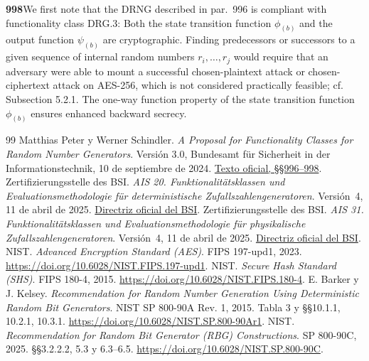 \documentclass[11pt,a4paper]{article}
\begin{document}
\textbf{998} We first note that the DRNG described in par.~996 is compliant with functionality class DRG.3: Both the state transition function \(\phi_{(b)}\) and the output function \(\psi_{(b)}\) are cryptographic. Finding predecessors or successors to a given sequence of internal random numbers \(r_i,\ldots,r_j\) would require that an adversary were able to mount a successful chosen-plaintext attack or chosen-ciphertext attack on AES-256, which is not considered practically feasible; cf. Subsection 5.2.1. The one-way function property of the state transition function \(\phi_{(b)}\) ensures enhanced backward secrecy.
\endgroup
\small
\begin{thebibliography}{99}
\setlength{\itemsep}{2pt}
 Matthias Peter y Werner Schindler. \emph{A Proposal for Functionality Classes for Random Number Generators}. Versión 3.0, Bundesamt für Sicherheit in der Informationstechnik, 10 de septiembre de 2024. \href{https://www.bsi.bund.de/SharedDocs/Downloads/EN/BSI/Certification/Interpretations/AIS_31_Functionality_classes_for_random_number_generators_e_2024.pdf?__blob=publicationFile\&v=3\#page=211}{Texto oficial, §§996--998}.
 Zertifizierungsstelle des BSI. \emph{AIS 20. Funktionalitätsklassen und Evaluationsmethodologie für deterministische Zufallszahlengeneratoren}. Versión~4, 11 de abril de 2025. \href{https://www.bsi.bund.de/SharedDocs/Downloads/DE/BSI/Zertifizierung/Interpretationen/AIS_20_pdf.pdf?__blob=publicationFile}{Directriz oficial del BSI}.
 Zertifizierungsstelle des BSI. \emph{AIS 31. Funktionalitätsklassen und Evaluationsmethodologie für physikalische Zufallszahlengeneratoren}. Versión~4, 11 de abril de 2025. \href{https://www.bsi.bund.de/SharedDocs/Downloads/DE/BSI/Zertifizierung/Interpretationen/AIS_31_pdf.pdf?__blob=publicationFile}{Directriz oficial del BSI}.
 NIST. \emph{Advanced Encryption Standard (AES)}. FIPS 197-upd1, 2023. \url{https://doi.org/10.6028/NIST.FIPS.197-upd1}.
 NIST. \emph{Secure Hash Standard (SHS)}. FIPS 180-4, 2015. \url{https://doi.org/10.6028/NIST.FIPS.180-4}.
 E. Barker y J. Kelsey. \emph{Recommendation for Random Number Generation Using Deterministic Random Bit Generators}. NIST SP 800-90A Rev. 1, 2015. Tabla 3 y §§10.1.1, 10.2.1, 10.3.1. \url{https://doi.org/10.6028/NIST.SP.800-90Ar1}.
 NIST. \emph{Recommendation for Random Bit Generator (RBG) Constructions}. SP 800-90C, 2025. §§3.2.2.2, 5.3 y 6.3--6.5. \url{https://doi.org/10.6028/NIST.SP.800-90C}.

\end{thebibliography}
\end{document}
